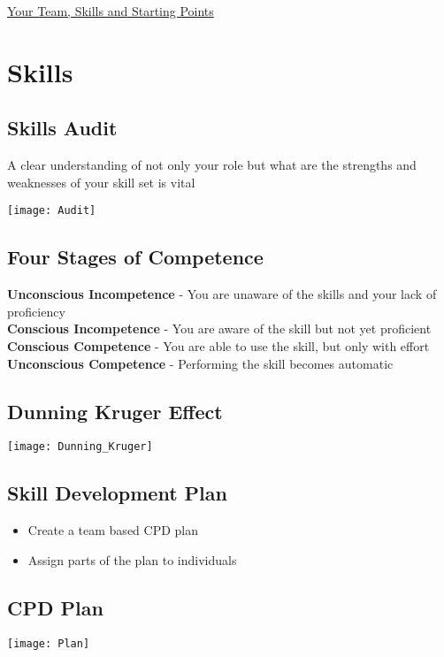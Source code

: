 \documentclass{article}[18pt]
\begin{document}
\begin{center}
\underline{\huge Your Team, Skills and Starting Points}
\end{center}
\section{Skills}
\subsection{Skills Audit}
A clear understanding of not only your role but what are the strengths and weaknesses of your skill set is vital
\begin{center}
	\texttt{[image: Audit]}
\end{center}
\subsection{Four Stages of Competence}
\textbf{Unconscious Incompetence} - You are unaware of the skills and your lack of proficiency\\
\textbf{Conscious Incompetence} - You are aware of the skill but not yet proficient\\
\textbf{Conscious Competence} - You are able to use the skill, but only with effort\\
\textbf{Unconscious Competence} - Performing the skill becomes automatic
\subsection{Dunning Kruger Effect}
\begin{center}
	\texttt{[image: Dunning\_Kruger]}
\end{center}
\subsection{Skill Development Plan}
\begin{itemize}
	\item Create a team based CPD plan
	\item Assign parts of the plan to individuals
\end{itemize}
\subsection{CPD Plan}
\begin{center}
	\texttt{[image: Plan]}
\end{center}
\end{document}
